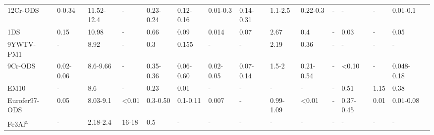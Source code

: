 \begin{sidewaystable}[]
{\begin{tabular}{lllllllllllllll}
12Cr-ODS              & 0-0.34      & 11.52-12.4  & -               & 0.23-0.24     & 0.12-0.16       & 0.01-0.3   & 0.14-0.31  & 1.1-2.5         & 0.22-0.3        & -               & -               & -           & 0.01-0.1    &\cite{RN953,RN954,RN1066,RN95,RN1382,RN3473,RN952,RN1080,RN1203,RN999}              \\
1DS                   & 0.15        & 10.98       & -               & 0.66          & 0.09            & 0.014      & 0.07       & 2.67            & 0.4             & -               & 0.03            & -           & 0.05        &\cite{RN1187}              \\
9YWTV-PM1             & -           & 8.92        & -               & 0.3           & 0.155           & -          & -          & 2.19            & 0.36            & -               & -               & -           & -           &\cite{RN1187}              \\
9Cr-ODS               & 0.02-0.06   & 8.6-9.66    & -               & 0.35-0.36     & 0.06-0.60       & 0.02-0.05  & 0.07-0.14  & 1.5-2           & 0.21-0.54       & -               & \textless{}0.10 & -           & 0.048-0.18  &\cite{RN1199,RN101,RN947,RN971,RN1039,RN1154,RN1184}              \\
EM10                  & -           & 8.6         & -               & 0.23          & 0.01            & -          & -          & -               & -               & -               & 0.51            & 1.15        & 0.38        &\cite{RN1109}              \\
Eurofer97-ODS         & 0.05        & 8.03-9.1    & \textless{}0.01 & 0.3-0.50      & 0.1-0.11        & 0.007      & -          & 0.99-1.09       & \textless{}0.01 & -               & 0.37-0.45       & 0.01        & 0.01-0.08   &\cite{RN735,RN1046,RN106,RN382,RN970,RN39,RN1047,RN25,RN1078}              \\
Fe3Al\textsuperscript{a}                & -           & 2.18-2.4    & 16-18           & 0.5           & -               & -          & -          & -               & -               & -               & -               & -           & -           &\cite{RN1033}              \\
                      
                      
                               
\end{tabular}%
	}
\label{tab:ferrousodscomp}
\end{sidewaystable}


